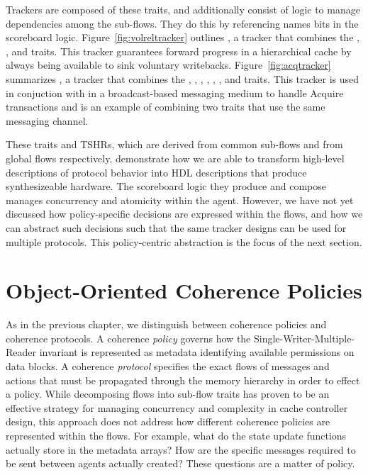 Trackers are composed of these traits, and additionally consist of logic to manage dependencies among the sub-flows.
They do this by referencing names bits in the scoreboard logic.
Figure~\ref{fig:volreltracker} outlines , a tracker that combines the
, , and  traits.
This tracker guarantees forward progress in a hierarchical cache by always being available to sink voluntary writebacks.
Figure~\ref{fig:acqtracker} summarizes , a tracker that combines the
, , 
, , , ,
and  traits.
This tracker is used in conjuction with in a broadcast-based messaging medium to handle Acquire transactions
and is an example of combining two traits that use the same messaging channel.

These traits and TSHRs, which are derived from common sub-flows and from global flows respectively,
demonstrate how we are able to transform high-level descriptions of protocol behavior into HDL descriptions
that produce synthesizeable hardware.
The scoreboard logic they produce and compose manages concurrency and atomicity within the agent.
However, we have not yet discussed how policy-specific decisions are expressed within the flows,
and how we can abstract such decisions such that the same tracker designs can be used for multiple protocols.
This policy-centric abstraction is the focus of the next section.

\section{Object-Oriented Coherence Policies}

As in the previous chapter, we distinguish between coherence policies and coherence protocols.
A coherence {\em policy} governs how the Single-Writer-Multiple-Reader invariant is represented as metadata identifying available permissions on data blocks.
A coherence {\em protocol} specifies the exact flows of messages and actions that must be propagated through the memory hierarchy in order to effect a policy.
While decomposing flows into sub-flow traits has proven to be an effective strategy for managing concurrency and complexity in cache controller design,
this approach does not address how different coherence policies are represented within the flows.
For example, what do the state update functions actually store in the metadata arrays?
How are the specific messages required to be sent between agents actually created?
These questions are a matter of policy.

